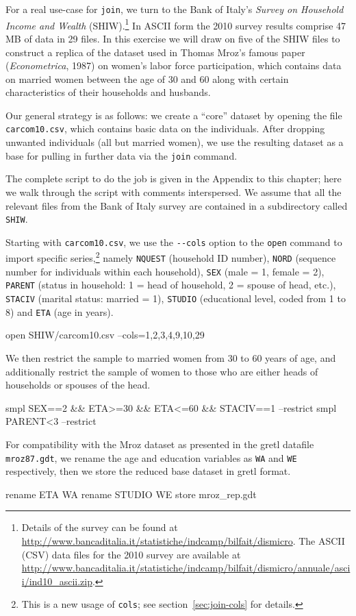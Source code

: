 For a real use-case for \texttt{join}, we turn to the Bank of Italy's
\textit{Survey on Household Income and Wealth}
(SHIW).\footnote{Details of the survey can be found at
  \url{http://www.bancaditalia.it/statistiche/indcamp/bilfait/dismicro}.
  The ASCII (CSV) data files for the 2010 survey are available at
  \url{http://www.bancaditalia.it/statistiche/indcamp/bilfait/dismicro/annuale/ascii/ind10_ascii.zip}.}
In ASCII form the 2010 survey results comprise 47\,MB of data in 29
files. In this exercise we will draw on five of the SHIW files to
construct a replica of the dataset used in Thomas Mroz's famous paper
(\textit{Econometrica}, 1987) on women's labor force participation,
which contains data on married women between the age of 30 and 60
along with certain characteristics of their households and husbands.

Our general strategy is as follows: we create a ``core'' dataset by
opening the file \texttt{carcom10.csv}, which contains basic data on
the individuals. After dropping unwanted individuals (all but married
women), we use the resulting dataset as a base for pulling in further
data via the \texttt{join} command.

The complete script to do the job is given in the Appendix to this
chapter; here we walk through the script with comments interspersed.
We assume that all the relevant files from the Bank of Italy survey
are contained in a subdirectory called \texttt{SHIW}.

Starting with \texttt{carcom10.csv}, we use the \verb|--cols| option
to the \texttt{open} command to import specific series,\footnote{This
  is a new usage of \texttt{cols}; see section~\ref{sec:join-cols} for
  details.} namely \texttt{NQUEST} (household ID number),
\texttt{NORD} (sequence number for individuals within each household),
\texttt{SEX} (male = 1, female = 2), \texttt{PARENT} (status in
household: 1 = head of household, 2 = spouse of head, etc.),
\texttt{STACIV} (marital status: married = 1), \texttt{STUDIO}
(educational level, coded from 1 to 8) and \texttt{ETA} (age in
years).
%
\begin{code}
open SHIW/carcom10.csv --cols=1,2,3,4,9,10,29
\end{code}
%
We then restrict the sample to married women from 30 to 60 years of
age, and additionally restrict the sample of women to those who are
either heads of households or spouses of the head.
%
\begin{code}
smpl SEX==2 && ETA>=30 && ETA<=60 && STACIV==1 --restrict
smpl PARENT<3  --restrict
\end{code}
%
For compatibility with the Mroz dataset as presented in the gretl
datafile \texttt{mroz87.gdt}, we rename the age and education
variables as \texttt{WA} and \texttt{WE} respectively, then we
store the reduced base dataset in gretl format.
%
\begin{code}
rename ETA WA
rename STUDIO WE
store mroz_rep.gdt
\end{code}

